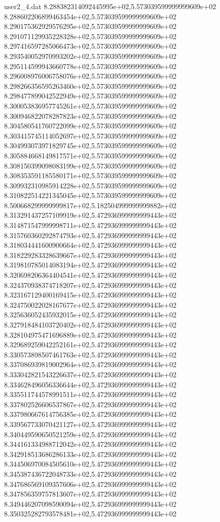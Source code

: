 \begin{filecontents}{user2_4.dat}
8.288382314092445995e+02,5.573039599999999609e+02
8.288602206899463454e+02,5.573039599999999609e+02
8.290175362929576295e+02,5.573039599999999609e+02
8.291071129935228328e+02,5.573039599999999609e+02
8.297416597285066473e+02,5.573039599999999609e+02
8.293540052970993202e+02,5.573039599999999609e+02
8.295114599943660778e+02,5.573039599999999609e+02
8.296008976006758076e+02,5.573039599999999609e+02
8.298266356595263460e+02,5.573039599999999609e+02
8.298477899042522949e+02,5.573039599999999609e+02
8.300053836957745261e+02,5.573039599999999609e+02
8.300946822078287823e+02,5.573039599999999609e+02
8.304580541760722099e+02,5.573039599999999609e+02
8.303415745114052697e+02,5.573039599999999609e+02
8.304993073971829745e+02,5.573039599999999609e+02
8.305884668149817571e+02,5.573039599999999609e+02
8.308150399098083199e+02,5.573039599999999609e+02
8.308353591185580171e+02,5.573039599999999609e+02
8.309932310985914228e+02,5.573039599999999609e+02
8.310822514221345045e+02,5.573039599999999609e+02
8.500668299999999817e+02,5.182504999999999882e+02
8.313291437257109919e+02,5.472936999999999443e+02
8.314871547999998711e+02,5.472936999999999443e+02
8.315760360292874793e+02,5.472936999999999443e+02
8.318034441600900664e+02,5.472936999999999443e+02
8.318229283328639667e+02,5.472936999999999443e+02
8.319810785014083194e+02,5.472936999999999443e+02
8.320698206364404541e+02,5.472936999999999443e+02
8.324370938374718207e+02,5.472936999999999443e+02
8.323167129400169415e+02,5.472936999999999443e+02
8.324750022028167677e+02,5.472936999999999443e+02
8.325636052435932015e+02,5.472936999999999443e+02
8.327918484103720402e+02,5.472936999999999443e+02
8.328104975471696889e+02,5.472936999999999443e+02
8.329689259042252161e+02,5.472936999999999443e+02
8.330573898507461763e+02,5.472936999999999443e+02
8.337086939819002964e+02,5.472936999999999443e+02
8.333042821543226637e+02,5.472936999999999443e+02
8.334628496056336644e+02,5.472936999999999443e+02
8.335511744578991511e+02,5.472936999999999443e+02
8.337802526606537867e+02,5.472936999999999443e+02
8.337980667614756385e+02,5.472936999999999443e+02
8.339567733070421127e+02,5.472936999999999443e+02
8.340449590650521259e+02,5.472936999999999443e+02
8.344161334988712042e+02,5.472936999999999443e+02
8.342918513686286133e+02,5.472936999999999443e+02
8.344506970084505610e+02,5.472936999999999443e+02
8.345387436722048733e+02,5.472936999999999443e+02
8.347686569109357606e+02,5.472936999999999443e+02
8.347856359757813607e+02,5.472936999999999443e+02
8.349446207098590094e+02,5.472936999999999443e+02
8.350325282793578481e+02,5.472936999999999443e+02

\end{filecontents}

